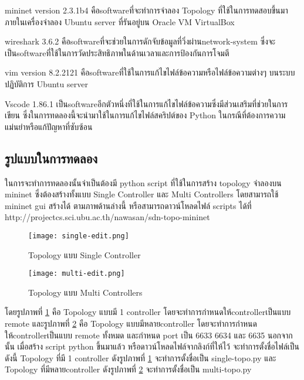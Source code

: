 mininet version 2.3.1b4
คือ\gls{software}ที่จะทำการจำลอง Topology ที่ใช้ในการทดสอบขึ้นมาภายในเครื่องจำลอง Ubuntu server ที่รันอยู่บน Oracle VM VirtualBox

wireshark 3.6.2
คือ\gls{software}ที่จะช่วยในการดักจับข้อมูลที่วิ่งผ่าน\gls{network-system} ซึ่งจะเป็น\gls{software}ที่ใช้ในการวัดประสิทธิภาพในด้านเวลาและการป้องกันการโจมตี

vim version 8.2.2121
คือ\gls{software}ที่ใช้ในการแก้ไขไฟล์ข้อความหรือไฟล์ข้อความต่างๆ บนระบบปฏิบัติการ Ubuntu server

Vscode 1.86.1
เป็น\gls{software}อีกตัวหนึ่งที่ใช้ในการแก้ไขไฟล์ข้อความซึ่งมีส่วนเสริมที่ช่วยในการเขียน ซึ่งในการทดลองนี้จะนำมาใช้ในการแก้ไขไฟล์สคริปต์ของ Python ในกรณีที่ต้องการความแม่นยำหรือแก้ปัญหาที่ซับซ้อน
\newline
\subsection{รูปแบบในการทดลอง}
ในการจะทำการทดลองนั้นจำเป็นต้องมี python script ที่ใช้ในการสร้าง topology จำลองบน mininet
ซึ่งต้องสร้างทั้งแบบ Single Controller และ Multi Controllers โดยสามารถใช้ mininet gui สร้างได้ ตามภาพด้านล่างนี้
หรือสามารถดาวน์โหลดไฟล์ scripts ได้ที่ http://projectcs.sci.ubu.ac.th/nawasan/sdn-topo-mininet
\\

\begin{figure}[h!]
    \centering
    \texttt{[image: single-edit.png]}
    \caption{Topology แบบ Single Controller}
    \label{img:topo_cs}
\end{figure}

\begin{figure}[h!]
    \centering
    \texttt{[image: multi-edit.png]}
    \caption{Topology แบบ Multi Controllers}
    \label{img:topo_cm}
\end{figure}

\pagebreak

โดยรูปภาพที่ \ref{img:topo_cs} คือ Topology แบบมี 1 \gls{controller} โดยจะทำการกำหนดให้\gls{controller}เป็นแบบ remote 
และรูปภาพที่ \ref{img:topo_cm} คือ Topology แบบมีหลาย\gls{controller} โดยจะทำการกำหนดให้\gls{controller}เป็นแบบ remote ทั้งหมด และกำหนด port เป็น 6633 6634 และ 6635
นอกจากนั้น เมื่อสร้าง script python ขึ้นมาแล้ว หรือดาวน์โหลดไฟล์จากลิงก์ที่ให้ไว้ จะทำการตั้งชื่อไฟล์เป็นดังนี้ Topology ที่มี 1 \gls{controller}
ดังรูปภาพที่ \ref{img:topo_cs} จะทำการตั้งชื่อเป็น single-topo.py และ Topology ที่มีหลาย\gls{controller} ดังรูปภาพที่ \ref{img:topo_cm} จะทำการตั้งชื่อเป็น multi-topo.py

